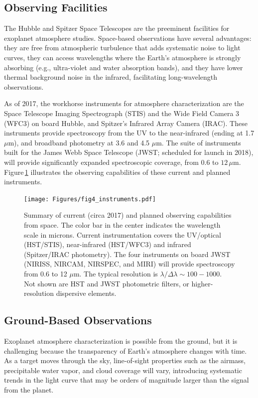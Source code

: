\documentclass[graybox,natbib,nosecnum]{svmult}
\begin{document}
\subsection{Observing Facilities}
The Hubble and Spitzer Space Telescopes are the preeminent facilities for exoplanet atmosphere studies.  Space-based observations have several advantages: they are free from atmospheric turbulence that adds systematic noise to light curves, they can access wavelengths where the Earth's atmosphere is strongly absorbing (e.g., ultra-violet and water absorption bands), and they have lower thermal background noise in the infrared, facilitating long-wavelength observations. 

As of 2017, the workhorse instruments for atmosphere characterization are the Space Telescope Imaging Spectrograph (STIS) and the Wide Field Camera 3 (WFC3) on board Hubble, and Spitzer's Infrared Array Camera (IRAC).  These instruments provide spectroscopy from the UV to the near-infrared (ending at 1.7 $\mu$m), and broadband photometry at 3.6 and 4.5 $\mu$m. The suite of instruments built for the James Webb Space Telescope (JWST; scheduled for launch in 2018), will provide significantly expanded spectroscopic coverage, from $0.6$ to $12\,\mu$m.  Figure\,\ref{fig:instruments} illustrates the observing capabilities of these current and planned instruments. 

\begin{figure}
\begin{centering}
\texttt{[image: Figures/fig4\_instruments.pdf]}
\caption{Summary of current (circa 2017) and planned observing capabilities from space. The color bar in the center indicates the wavelength scale in microns. Current instrumentation covers the UV/optical (HST/STIS), near-infrared (HST/WFC3) and infrared (Spitzer/IRAC photometry). The four instruments on board JWST (NIRISS, NIRCAM, NIRSPEC, and MIRI) will provide spectroscopy from 0.6 to 12 $\mu$m. The typical resolution is $\lambda/\Delta \lambda \sim100 - 1000$. Not shown are HST and JWST photometric filters, or higher-resolution dispersive elements.}
\label{fig:instruments}       
\end{centering}
\end{figure}


\subsection{Ground-Based Observations}
Exoplanet atmosphere characterization is possible from the ground, but it is challenging because
the transparency of Earth's atmosphere changes with time.  As a target moves through the sky, line-of-sight properties such as the airmass, precipitable water vapor, and cloud coverage will vary, introducing systematic trends in the light curve that may be orders of magnitude larger than the signal from the planet. 
\end{document}
